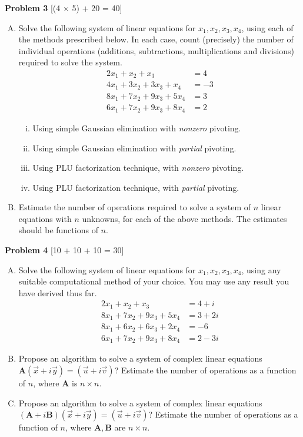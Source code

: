 \documentclass[11pt,a4paper]{article}
\begin{document}
{\large\textbf{Problem 3}} \hfill [(4 $\times$ 5) + 20 = 40]

\begin{enumerate}[A.]
\item Solve the following system of linear equations for $x_1, x_2, x_3, x_4$, using each of the methods prescribed below. In each case, count (precisely) the number of individual operations (additions, subtractions, multiplications and divisions) required to solve the system.
\begin{align*}
2 x_1 + x_2 + x_3 &= 4 \\
4 x_1 + 3 x_2 + 3 x_3 + x_4 &= -3 \\
8 x_1 + 7 x_2 + 9 x_3 + 5 x_4 &= 3 \\
6 x_1 + 7 x_2 + 9 x_3 + 8 x_4 &= 2
\end{align*}
\begin{enumerate}[(i)]
\item Using simple Gaussian elimination with \emph{nonzero} pivoting.
\item Using simple Gaussian elimination with \emph{partial} pivoting.
\item Using PLU factorization technique, with \emph{nonzero} pivoting.
\item Using PLU factorization technique, with \emph{partial} pivoting.
\end{enumerate}

\item Estimate the number of operations required to solve a system of $n$ linear equations with $n$ unknowns, for each of the above methods. The estimates should be functions of $n$.
\end{enumerate}

{\large\textbf{Problem 4}} \hfill [10 + 10 + 10 = 30]

\begin{enumerate}[A.]
\item Solve the following system of linear equations for $x_1, x_2, x_3, x_4$, using any suitable computational method of your choice. You may use any result you have derived thus far.
\begin{align*}
2 x_1 + x_2 + x_3 &= 4 + i \\
8 x_1 + 7 x_2 + 9 x_3 + 5 x_4 &= 3 + 2 i \\
8 x_1 + 6 x_2 + 6 x_3 + 2 x_4 &= -6 \\
6 x_1 + 7 x_2 + 9 x_3 + 8 x_4 &= 2 - 3 i
\end{align*}
\item Propose an algorithm to solve a system of complex linear equations $\mathbf{A} (\vec{x} + i \vec{y}) = (\vec{u} + i \vec{v})$? Estimate the number of operations as a function of $n$, where $\mathbf{A}$ is $n \times n$.
\item Propose an algorithm to solve a system of complex linear equations $(\mathbf{A} + i \mathbf{B}) (\vec{x} + i \vec{y}) = (\vec{u} + i \vec{v})$? Estimate the number of operations as a function of $n$, where $\mathbf{A}, \mathbf{B}$ are $n \times n$.
\end{enumerate}
\end{document}
